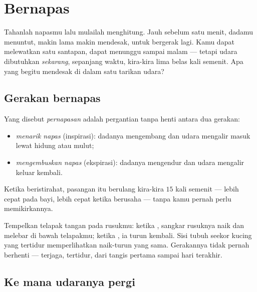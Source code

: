 \chapter{Bernapas}\label{ch:g4:breathing}

Tahanlah napasmu lalu mulailah menghitung. Jauh sebelum satu menit,
dadamu menuntut, makin lama makin mendesak, untuk bergerak lagi. Kamu
dapat melewatkan satu santapan,  dapat menunggu sampai malam ---
tetapi udara dibutuhkan \emph{sekarang}, sepanjang waktu, kira-kira
lima belas kali semenit. Apa yang begitu mendesak di dalam satu tarikan
udara?

\section{Gerakan bernapas}

\begin{definition}\label{def:g4:breathing:movements}
Yang disebut \emph{pernapasan} adalah pergantian
tanpa henti antara dua gerakan:
\begin{itemize}
  \item \emph{menarik napas} (inspirasi): dadanya
        mengembang dan udara mengalir masuk lewat hidung atau mulut;
  \item \emph{mengembuskan napas} (ekspirasi):
        dadanya mengendur dan udara mengalir keluar kembali.
\end{itemize}
Ketika beristirahat, pasangan itu berulang kira-kira $15$ kali semenit
--- lebih cepat pada bayi, lebih cepat ketika berusaha --- tanpa kamu
pernah perlu memikirkannya.
\end{definition}

\begin{example}\label{ex:g4:breathing:watch}
Tempelkan telapak tangan pada  rusukmu: ketika ,
sangkar rusuknya naik dan melebar di bawah telapakmu; ketika
, ia turun kembali. Sisi tubuh seekor kucing
yang tertidur memperlihatkan naik-turun yang sama. Gerakannya tidak pernah
berhenti --- terjaga, tertidur, dari tangis pertama sampai hari
terakhir.
\end{example}

\section{Ke mana udaranya pergi}

